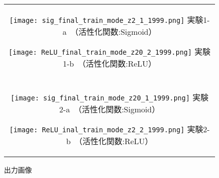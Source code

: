 \documentclass[12pt]{jsarticle}
\begin{document}
\begin{figure}[ht]
  \begin{center}
    \begin{tabular}{c}

      \begin{minipage}{0.5\hsize}
        \begin{center}
          \texttt{[image: sig\_final\_train\_mode\_z2\_1\_1999.png]}
          \hspace{0.2cm} 実験1-a　（活性化関数:Sigmoid）
        \end{center}
      \end{minipage}

      \begin{minipage}{0.5\hsize}
        \begin{center}
          \texttt{[image: ReLU\_final\_train\_mode\_z20\_2\_1999.png]}
          \hspace{0.2cm} 実験1-b　（活性化関数:ReLU）
        \end{center}
      \end{minipage}\\\\

      \begin{minipage}{0.5\hsize}
        \begin{center}
          \texttt{[image: sig\_final\_train\_mode\_z20\_1\_1999.png]}
          \hspace{0.2cm} 実験2-a　（活性化関数:Sigmoid）
        \end{center}
      \end{minipage}

      \begin{minipage}{0.5\hsize}
        \begin{center}
          \texttt{[image: ReLU\_inal\_train\_mode\_z2\_2\_1999.png]}
          \hspace{0.2cm} 実験2-b　（活性化関数:ReLU）
        \end{center}
      \end{minipage}

    \end{tabular}
    \caption{出力画像}
     \label{fig:output2}
  \end{center}
\end{figure}
\end{document}
